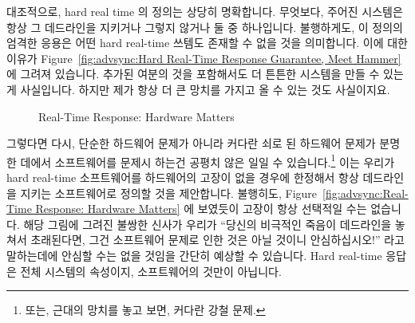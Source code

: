 대조적으로, hard real time 의 정의는 상당히 명확합니다.
무엇보다, 주어진 시스템은 항상 그 데드라인을 지키거나 그렇지 않거나 둘 중
하나입니다.
불행하게도, 이 정의의 엄격한 응용은 어떤 hard real-time 쓰템도 존재할 수 없을
것을 의미합니다.
이에 대한 이유가
Figure~\ref{fig:advsync:Hard Real-Time Response Guarantee, Meet Hammer} 에 그려져
있습니다.
추가된 여분의 것을 포함해서도 더 튼튼한 시스템을 만들 수 있는게 사실입니다.
하지만 제가 항상 더 큰 망치를 가지고 올 수 있는 것도 사실이지요.

\begin{figure}[bt]
\centering
{}
\caption{Real-Time Response: Hardware Matters}
\end{figure}

그렇다면 다시, 단순한 하드웨어 문제가 아니라 커다란 쇠로 된 하드웨어 문제가
분명한 데에서 소프트웨어를 문제시 하는건 공평치 않은 일일 수
있습니다.\footnote{
	또는, 근대의 망치를 놓고 보면, 커다란 강철 문제.}
이는 우리가 hard real-time 소프트웨어를 하드웨어의 고장이 없을 경우에 한정해서
항상 데드라인을 지키는 소프트웨어로 정의할 것을 제안합니다.
불행히도,
Figure~\ref{fig:advsync:Real-Time Response: Hardware Matters} 에 보였듯이 고장이
항상 선택적일 수는 없습니다.
해당 그림에 그려진 불쌍한 신사가 우리가 ``당신의 비극적인 죽음이 데드라인을
놓쳐서 초래된다면, 그건 소프트웨어 문제로 인한 것은 아닐 것이니 안심하십시오!''
라고 말하는데에 안심할 수는 없을 것임을 간단히 예상할 수 있습니다.
Hard real-time 응답은 전체 시스템의 속성이지, 소프트웨어의 것만이 아닙니다.

